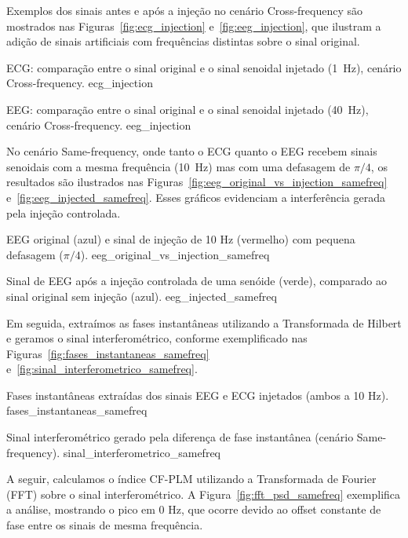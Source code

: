 Exemplos dos sinais antes e após a injeção no cenário Cross-frequency são mostrados nas Figuras~\ref{fig:ecg_injection} e~\ref{fig:eeg_injection}, que ilustram a adição de sinais artificiais com frequências distintas sobre o sinal original.


{ECG: comparação entre o sinal original e o sinal senoidal injetado (1~Hz), cenário Cross-frequency.}
{ecg_injection}

{EEG: comparação entre o sinal original e o sinal senoidal injetado (40~Hz), cenário Cross-frequency.}
{eeg_injection}


No cenário Same-frequency, onde tanto o ECG quanto o EEG recebem sinais senoidais com a mesma frequência (10~Hz) mas com uma defasagem de \(\pi/4\), os resultados são ilustrados nas Figuras~\ref{fig:eeg_original_vs_injection_samefreq} e~\ref{fig:eeg_injected_samefreq}. Esses gráficos evidenciam a interferência gerada pela injeção controlada.

{EEG original (azul) e sinal de injeção de 10 Hz (vermelho) com pequena defasagem (\(\pi/4\)).}
{eeg_original_vs_injection_samefreq}

{Sinal de EEG após a injeção controlada de uma senóide (verde), comparado ao sinal original sem injeção (azul).}
{eeg_injected_samefreq}


Em seguida, extraímos as fases instantâneas utilizando a Transformada de Hilbert e geramos o sinal interferométrico, conforme exemplificado nas Figuras~\ref{fig:fases_instantaneas_samefreq} e~\ref{fig:sinal_interferometrico_samefreq}.

{Fases instantâneas extraídas dos sinais EEG e ECG injetados (ambos a 10 Hz).}
{fases_instantaneas_samefreq}

{Sinal interferométrico gerado pela diferença de fase instantânea (cenário Same-frequency).}
{sinal_interferometrico_samefreq}


A seguir, calculamos o índice CF-PLM utilizando a Transformada de Fourier (FFT) sobre o sinal interferométrico. A Figura~\ref{fig:fft_psd_samefreq} exemplifica a análise, mostrando o pico em 0 Hz, que ocorre devido ao offset constante de fase entre os sinais de mesma frequência.

